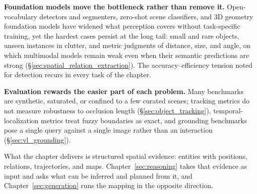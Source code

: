 \textbf{Foundation models move the bottleneck rather than remove it.} Open-vocabulary detectors and segmenters, zero-shot scene classifiers, and 3D geometry foundation models have widened what perception covers without task-specific training, yet the hardest cases persist at the long tail: small and rare objects, unseen instances in clutter, and metric judgments of distance, size, and angle, on which multimodal models remain weak even when their semantic predictions are strong (§\ref{sec:spatial_relation_extraction}). The accuracy--efficiency tension noted for detection recurs in every task of the chapter.

\textbf{Evaluation rewards the easier part of each problem.} Many benchmarks are synthetic, saturated, or confined to a few curated scenes; tracking metrics do not measure robustness to occlusion length (§\ref{sec:object_tracking}), temporal-localization metrics treat fuzzy boundaries as exact, and grounding benchmarks pose a single query against a single image rather than an interaction (§\ref{sec:vl_grounding}).

What the chapter delivers is structured spatial evidence: entities with positions, relations, trajectories, and maps. Chapter~\ref{sec:reasoning} takes that evidence as input and asks what can be inferred and planned from it, and Chapter~\ref{sec:generation} runs the mapping in the opposite direction.